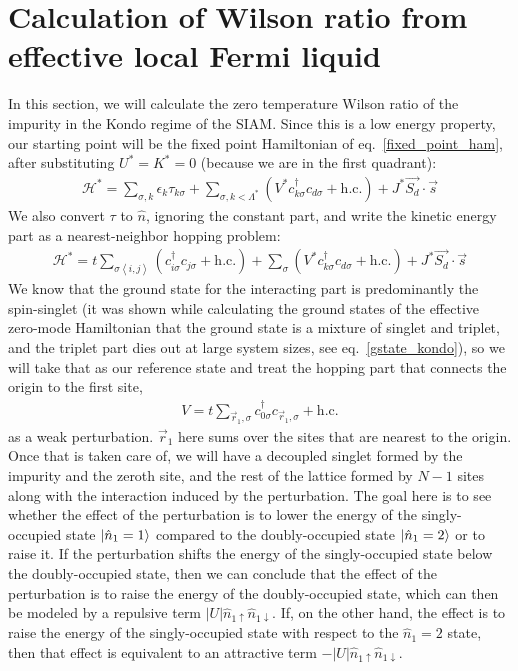\documentclass[twoside]{report}
\numberwithin{equation}{section}
\begin{document}
\section{Calculation of Wilson ratio from effective local Fermi liquid}
In this section, we will calculate the zero temperature Wilson ratio of the impurity in the Kondo regime of the SIAM. Since this is a low energy property, our starting point will be the fixed point Hamiltonian of eq.~\ref{fixed_point_ham}, after substituting \(U^*=K^*=0\) (because we are in the first quadrant):
\begin{equation}\begin{aligned}
	\mathcal{H}^* = \sum_{\sigma, k}\epsilon_k \tau_{k\sigma} + \sum_{\sigma, k < \Lambda^*}\left( V^* c^\dagger_{k\sigma}c_{d\sigma} + \text{h.c.} \right) + J^* \vec{S_d}\cdot\vec{s}
\end{aligned}\end{equation}
We also convert \(\tau\) to \(\hat n\), ignoring the constant part, and write the kinetic energy part as a nearest-neighbor hopping problem:
\begin{equation}\begin{aligned}
	\mathcal{H}^* = t\sum_{\sigma\left<i,j \right>}\left(c^\dagger_{i\sigma}c_{j\sigma} + \text{h.c.}\right) + \sum_{\sigma}\left( V^* c^\dagger_{k\sigma}c_{d\sigma} + \text{h.c.} \right) + J^* \vec{S_d}\cdot\vec{s}
\end{aligned}\end{equation}
We know that the ground state for the interacting part is predominantly the spin-singlet (it was shown while calculating the ground states of the effective zero-mode Hamiltonian that the ground state is a mixture of singlet and triplet, and the triplet part dies out at large system sizes, see eq.~\ref{gstate_kondo}), so we will take that as our reference state and treat the hopping part that connects the origin to the first site,
\begin{equation}\begin{aligned}
	V = t\sum_{\vec r_1,\sigma} c^\dagger_{0\sigma}c_{\vec r_1,\sigma} +\text{h.c.}
\end{aligned}\end{equation}
as a weak perturbation. \(\vec r_1\) here sums over the sites that are nearest to the origin. Once that is taken care of, we will have a decoupled singlet formed by the impurity and the zeroth site, and the rest of the lattice formed by \(N-1\) sites along with the interaction induced by the perturbation. The goal here is to see whether the effect of the perturbation is to lower the energy of the singly-occupied state \(\ket{\hat n_1 = 1}\) compared to the doubly-occupied state \(\ket{\hat n_1 = 2}\) or to raise it. If the perturbation shifts the energy of the singly-occupied state below the doubly-occupied state, then we can conclude that the effect of the perturbation is to raise the energy of the doubly-occupied state, which can then be modeled  by a repulsive term \(|U|\hat n_{1\uparrow}\hat n_{1\downarrow}\). If, on the other hand, the effect is to raise the energy of the singly-occupied state with respect to the \(\hat n_1 = 2\) state, then that effect is equivalent to an attractive term \(-|U|\hat n_{1\uparrow}\hat n_{1\downarrow}\).
\end{document}
